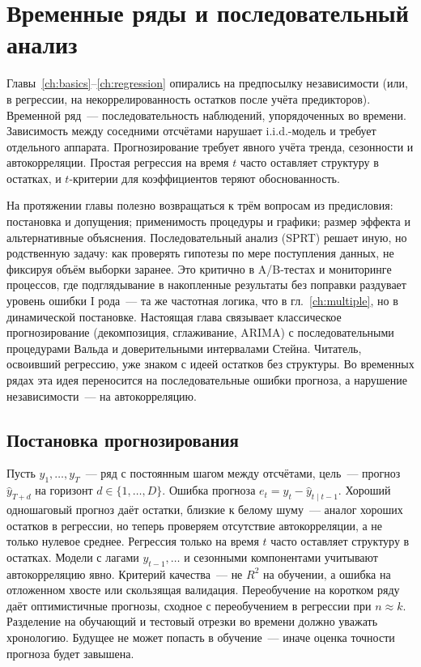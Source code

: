 \chapter{Временные ряды и последовательный анализ}
\label{ch:timeseries}

Главы~\ref{ch:basics}--\ref{ch:regression} опирались на предпосылку независимости (или, в регрессии, на некоррелированность остатков после учёта предикторов). Временной ряд~--- последовательность наблюдений, упорядоченных во времени. Зависимость между соседними отсчётами нарушает i.i.d.-модель и требует отдельного аппарата.
Прогнозирование требует явного учёта тренда, сезонности и автокорреляции. Простая регрессия на время $t$ часто оставляет структуру в остатках, и $t$-критерии для коэффициентов теряют обоснованность.


На протяжении главы полезно возвращаться к трём вопросам из предисловия: постановка и допущения; применимость процедуры и графики; размер эффекта и альтернативные объяснения. 
Последовательный анализ (SPRT) решает иную, но родственную задачу: как проверять гипотезы по мере поступления данных, не фиксируя объём выборки заранее. Это критично в A/B-тестах и мониторинге процессов, где подглядывание в накопленные результаты без поправки раздувает уровень ошибки I рода~--- та же частотная логика, что в гл.~\ref{ch:multiple}, но в динамической постановке.
Настоящая глава связывает классическое прогнозирование (декомпозиция, сглаживание, ARIMA) с последовательными процедурами Вальда и доверительными интервалами Стейна.
Читатель, освоивший регрессию, уже знаком с идеей остатков без структуры. Во временных рядах эта идея переносится на последовательные ошибки прогноза, а нарушение независимости~--- на автокорреляцию.

\section{Постановка прогнозирования}

Пусть $y_1,\ldots,y_T$~--- ряд с постоянным шагом между отсчётами, цель~--- прогноз $\hat y_{T+d}$ на горизонт $d\in\{1,\ldots,D\}$.
Ошибка прогноза $e_t=y_t-\hat y_{t\mid t-1}$. Хороший одношаговый прогноз даёт остатки, близкие к белому шуму~--- аналог хороших остатков в регрессии, но теперь проверяем отсутствие автокорреляции, а не только нулевое среднее.
Регрессия только на время $t$ часто оставляет структуру в остатках. Модели с лагами $y_{t-1},\ldots$ и сезонными компонентами учитывают автокорреляцию явно.
Критерий качества~--- не $R^2$ на обучении, а ошибка на отложенном хвосте или скользящая валидация. Переобучение на коротком ряду даёт оптимистичные прогнозы, сходное с переобучением в регрессии при $n\approx k$.
Разделение на обучающий и тестовый отрезки во времени должно уважать хронологию. Будущее не может попасть в обучение~--- иначе оценка точности прогноза будет завышена.

